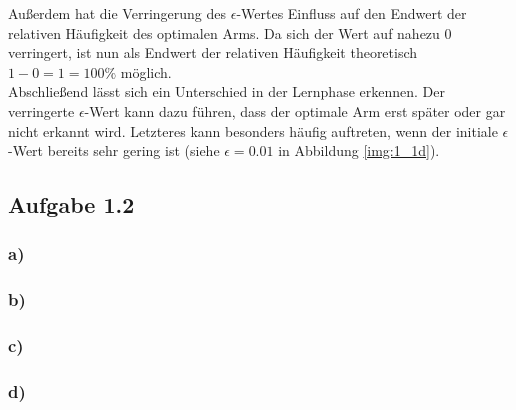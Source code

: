 \documentclass[11pt]{article}
\begin{document}
Außerdem hat die Verringerung des $\epsilon$-Wertes Einfluss auf den Endwert der relativen Häufigkeit des optimalen Arms. Da sich der Wert auf nahezu $0$ verringert, ist nun als Endwert der relativen Häufigkeit theoretisch $1-0=1=100\%$ möglich.\\
Abschließend lässt sich ein Unterschied in der Lernphase erkennen. Der verringerte $\epsilon$-Wert kann dazu führen, dass der optimale Arm erst später oder gar nicht erkannt wird. Letzteres kann besonders häufig auftreten, wenn der initiale $\epsilon$-Wert bereits sehr gering ist (siehe $\epsilon=0.01$ in Abbildung \ref{img:1_1d}).

\subsection*{Aufgabe 1.2}
\subsubsection*{a)}
\subsubsection*{b)}
\subsubsection*{c)}
\subsubsection*{d)}

\end{document}
